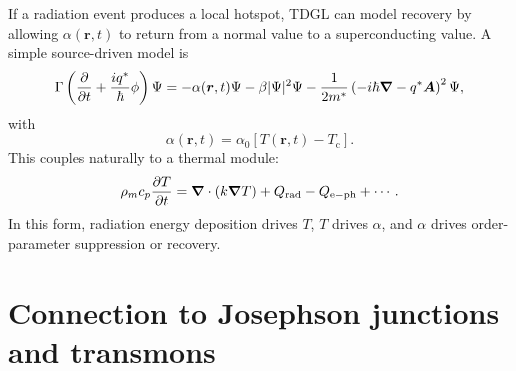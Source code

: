 \documentclass[11pt]{article}
\numberwithin{equation}{section}
\newcommand{\rvec}{\bm{r}}
\newcommand{\Avec}{\bm{A}}
\renewcommand{\grad}{\bm{\nabla}}
\newcommand{\Tc}{T_{\mathrm{c}}}
\newcommand{\Ord}{\Psi}
\newcommand{\GammaTD}{\Gamma}
\begin{document}
If a radiation event produces a local hotspot, TDGL can model recovery by allowing $\alpha(\rvec,t)$ to return from a normal value to a superconducting value. A simple source-driven model is
\begin{equation}
\GammaTD\left(\pdv{}{t}+\frac{iq^*}{\hbar}\phi\right)\Ord
=-\alpha(\rvec,t)\Ord-\beta|\Ord|^2\Ord-\frac{1}{2m^*}\left(-i\hbar\grad-q^*\Avec\right)^2\Ord,
\end{equation}
with
\begin{equation}
\alpha(\rvec,t)=\alpha_0[T(\rvec,t)-\Tc].
\end{equation}
This couples naturally to a thermal module:
\begin{equation}
\rho_m c_p\pdv{T}{t}=\grad\cdot(k\grad T)+Q_{\mathrm{rad}}-Q_{\mathrm{e-ph}}+\cdots.
\end{equation}
In this form, radiation energy deposition drives $T$, $T$ drives $\alpha$, and $\alpha$ drives order-parameter suppression or recovery.

\section{Connection to Josephson junctions and transmons}
\end{document}
